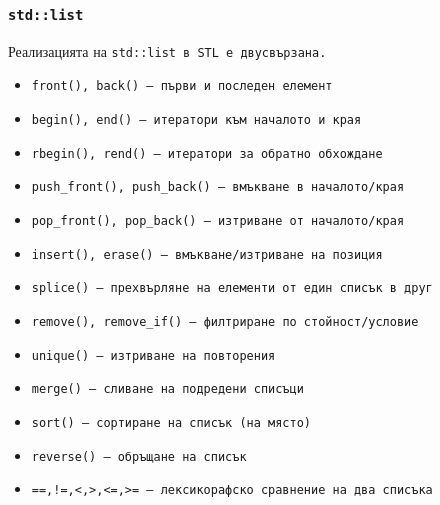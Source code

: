 \documentclass{beamer}
\begin{document}
\begin{frame}
  \frametitle{\tt{std::list}}
  \small
  Реализацията на \tt{std::list} в STL е двусвързана.
  \begin{itemize}
  \item \tt{front()}, \tt{back()} --- първи и последен елемент
  \item \tt{begin()}, \tt{end()} --- итератори към началото и края
  \item \tt{rbegin()}, \tt{rend()} --- итератори за обратно обхождане
  \item \tt{push\_front()}, \tt{push\_back()} --- вмъкване в началото/края
  \item \tt{pop\_front()}, \tt{pop\_back()} --- изтриване от началото/края
  \item \tt{insert()}, \tt{erase()} --- вмъкване/изтриване на позиция
  \item \tt{splice()} --- прехвърляне на елементи от един списък в друг
  \item \tt{remove()}, \tt{remove\_if()} --- филтриране по стойност/условие
  \item \tt{unique()} --- изтриване на повторения
  \item \tt{merge()} --- сливане на подредени списъци
  \item \tt{sort()} --- сортиране на списък (на място)
  \item \tt{reverse()} --- обръщане на списък
  \item \tt{==,!=,<,>,<=,>=} --- лексикорафско сравнение на два списъка
  \end{itemize}
\end{frame}
\end{document}
